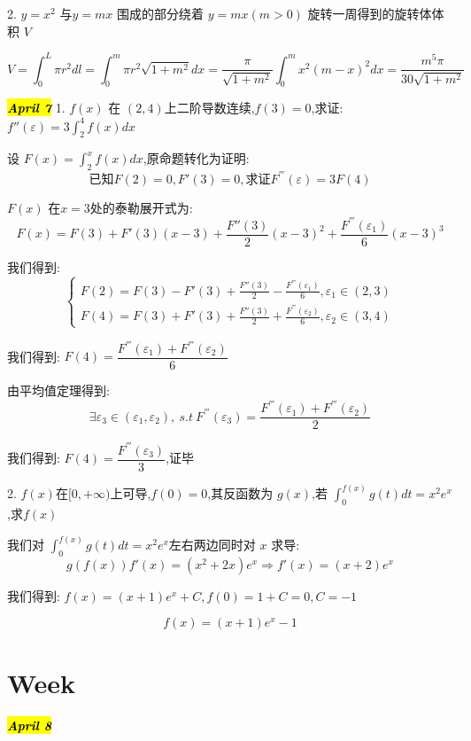 2. $y=x^2$ 与$y=mx$ 围成的部分绕着 $y=mx(m>0)$ 旋转一周得到的旋转体体积 $V$
\begin{solution}
	
	$$V=\int_{0}^{L}\pi r^2dl=\int_{0}^{m}\pi r^2\sqrt{1+m^2}dx=\frac{\pi}{\sqrt{1+m^2}}\int_{0}^{m}x^2(m-x)^2dx
	=\frac{m^5\pi}{30\sqrt{1+m^2}}$$
\end{solution}

\hl{\textbf{\textit{April 7}}}
1. $f(x)$ 在 $(2,4)$上二阶导数连续,$f(3)=0$,求证: $f''(\varepsilon)=3\int_{2}^{4}f(x)dx$
\begin{solution}
	
	设 $ F(x)=\int_{2}^{x}f(x)dx$,原命题转化为证明: $$\text{已知}F(2)=0,F'(3)=0,\text{求证}F^{'''}(\varepsilon)=3F(4)$$
	
	$F(x)$ 在$x=3$处的泰勒展开式为: 
	$$F(x)=F(3)+F'(3)(x-3)+\frac{F''(3)}{2}(x-3)^2+\frac{F^{'''}(\varepsilon_{1})}{6}(x-3)^{3}$$
	
	我们得到: 
	$$\left\lbrace 
	\begin{array}{l}
		F(2)=F(3)-F'(3)+\frac{F''(3)}{2}-\frac{F^{'''}(\varepsilon_{1})}{6},\varepsilon_{1}\in (2,3)\\
		F(4)=F(3)+F'(3)+\frac{F''(3)}{2}+\frac{F^{'''}(\varepsilon_{2})}{6},\varepsilon_{2}\in (3,4)
	\end{array}\right. $$

	我们得到: $F(4)=\dfrac{F^{'''}(\varepsilon_{1})+F^{'''}(\varepsilon_{2})}{6}$
	
	由平均值定理得到: $$\exists \varepsilon_{3}\in(\varepsilon_{1},\varepsilon_{2}),\ s.t\ F^{'''}(\varepsilon_{3})=\frac{F^{'''}(\varepsilon_{1})+F^{'''}(\varepsilon_{2})}{2}$$
	
	我们得到: $F(4)=\dfrac{F^{'''}(\varepsilon_{3})}{3}$,证毕
	
\end{solution}

2. $f(x)$在$[0,+\infty)$上可导,$f(0)=0$,其反函数为 $g(x)$,若 $\int_{0}^{f(x)}g(t)dt=x^2e^x$,求$f(x)$
\begin{solution}
	
	我们对 $\int_{0}^{f(x)}g(t)dt=x^2e^x$左右两边同时对 $x$ 求导: 
	$$g(f(x))f'(x)=(x^2+2x)e^x\Rightarrow f'(x)=(x+2)e^{x}$$
	
	我们得到: $f(x)=(x+1)e^x+C,f(0)=1+C=0,C=-1$
	
	$$f(x)=(x+1)e^{x}-1$$
\end{solution}

\section{Week }
\hl{\textbf{\textit{April 8}}}

